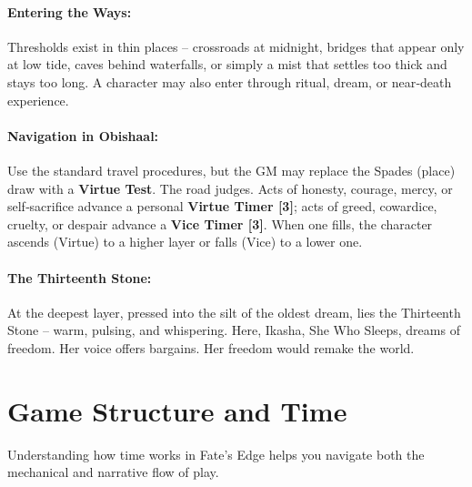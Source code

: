 \paragraph{Entering the Ways:} Thresholds exist in thin places -- crossroads at midnight, bridges that appear only at low tide, caves behind waterfalls, or simply a mist that settles too thick and stays too long. A character may also enter through ritual, dream, or near‑death experience.

\paragraph{Navigation in Obishaal:} Use the standard travel procedures, but the GM may replace the Spades (place) draw with a \textbf{Virtue Test}. The road judges. Acts of honesty, courage, mercy, or self‑sacrifice advance a personal \textbf{Virtue Timer [3]}; acts of greed, cowardice, cruelty, or despair advance a \textbf{Vice Timer [3]}. When one fills, the character ascends (Virtue) to a higher layer or falls (Vice) to a lower one.

\paragraph{The Thirteenth Stone:} At the deepest layer, pressed into the silt of the oldest dream, lies the Thirteenth Stone -- warm, pulsing, and whispering. Here, Ikasha, She Who Sleeps, dreams of freedom. Her voice offers bargains. Her freedom would remake the world.

\section{Game Structure and Time}
\label{sec:game-structure}

Understanding how time works in Fate's Edge helps you navigate both the mechanical and narrative flow of play.

